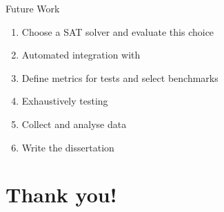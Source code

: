 \documentclass[10pt]{beamer}
\begin{document}
\begin{frame}{Future Work}
    \begin{enumerate}[<+- | visible@+(1)->]
        \item Choose a SAT solver and evaluate this choice
        \item Automated integration with \ksp
        \item Define metrics for tests and select benchmarks
        \item Exhaustively testing
        \item Collect and analyse data
        \item Write the dissertation
    \end{enumerate}

\end{frame}

\section{Thank you!}
\begin{frame}
    \titlepage
\end{frame}
\end{document}
